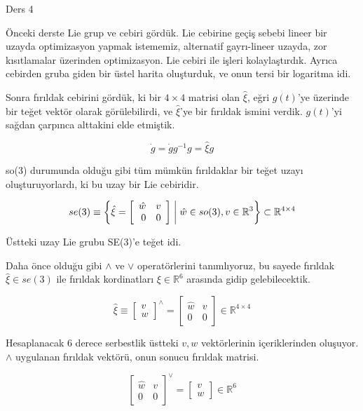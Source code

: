 \documentclass[12pt,fleqn]{article}\usepackage{../../common}
\begin{document}
Ders 4

Önceki derste Lie grup ve cebiri gördük. Lie cebirine geçiş sebebi lineer bir
uzayda optimizasyon yapmak istememiz, alternatif gayrı-lineer uzayda, zor
kısıtlamalar üzerinden optimizasyon. Lie cebiri ile işleri
kolaylaştırdık. Ayrıca cebirden gruba giden bir üstel harita oluşturduk, ve onun
tersi bir logaritma idi.

Sonra fırıldak cebirini gördük, ki bir $4 \times 4$ matrisi olan
$\hat{\xi}$, eğri $g(t)$'ye üzerinde bir teğet vektör olarak
görülebilirdi, ve $\hat{\xi}$'ye bir fırıldak ismini verdik. $g(t)$'yi
sağdan çarpınca alttakini elde etmiştik.

$$ \dot{g} = \dot{g}g^{-1}g = \hat{\xi} g $$

so(3) durumunda olduğu gibi tüm mümkün fırıldaklar bir teğet uzayı
oluşturuyorlardı, ki bu uzay bir Lie cebiridir.

$$ 
se(3) \equiv \bigg\{
\hat{\xi} =
\left[\begin{array}{rrr}
\hat{w} & v \\ 0 & 0
\end{array}\right] 
\biggm\vert
\hat{w} \in so(3), v \in \mathbb{R}^3 
\bigg\}
\subset \mathbb{R}^{4 \times 4}
 $$

Üstteki uzay Lie grubu SE(3)'e teğet idi.

Daha önce olduğu gibi $\land$ ve $\lor$ operatörlerini tanımlıyoruz, bu
sayede fırıldak $\hat{\xi} \in se(3)$ ile fırıldak kordinatları $\xi \in \mathbb{R}^6$ 
arasında gidip gelebilecektik.

$$ \hat{\xi} 
\equiv
\left[\begin{array}{c}
v \\ w
\end{array}\right]^{\land} 
=
\left[\begin{array}{cc}
\hat{w} & v \\ 0 & 0
\end{array}\right]  \in \mathbb{R}^{4 \times 4}
 $$

Hesaplanacak 6 derece serbestlik üstteki $v,w$ vektörlerinin
içeriklerinden oluşuyor. $\land$ uygulanan fırıldak vektörü, onun sonucu
fırıldak matrisi. 

$$ 
\left[\begin{array}{cc}
\hat{w} & v \\ 0 & 0
\end{array}\right]^{\lor} = 
\left[\begin{array}{c}
v \\ w
\end{array}\right] \in \mathbb{R}^6
 $$
\end{document}
